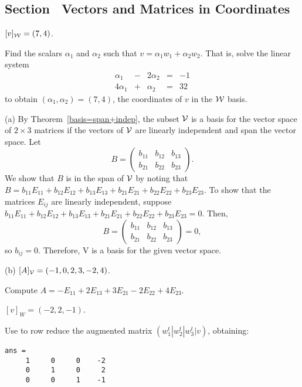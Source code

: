 \documentclass{ximera}
\begin{document}
\newpage
\subsection*{Section~\protect{\ref{S:coordinates}} Vectors and Matrices in
Coordinates}

\ans $[v]_{\cal W} = (7,4)$.

\soln Find the scalars $\alpha_1$ and $\alpha_2$ such that $v = \alpha_1w_1
+ \alpha_2w_2$.  That is, solve the linear system
\[ \begin{array}{rrrrr}
\alpha_1 & - & 2\alpha_2 & = & -1 \\
4\alpha_1 & + & \alpha_2 & = & 32 \end{array} \]
to obtain $(\alpha_1,\alpha_2) = (7,4)$, the coordinates
of $v$ in the ${\cal W}$ basis.

(a) By Theorem~\ref{basis=span+indep},
the subset ${\cal V}$ is a basis for the vector space of $2 \times
3$ matrices if the vectors of ${\cal V}$ are linearly independent and
span the vector space.  Let
\[ B = \left(\begin{array}{rrr} b_{11} & b_{12} & b_{13} \\ b_{21} &
b_{22} & b_{23} \end{array}\right). \]
We show that $B$ is in the span of ${\cal V}$ by noting that
$B = b_{11}E_{11} + b_{12}E_{12} + b_{13}E_{13} + b_{21}E_{21}
+ b_{22}E_{22} + b_{23}E_{23}$.  To show that the matrices $E_{ij}$
are linearly independent, suppose $b_{11}E_{11} + b_{12}E_{12} +
b_{13}E_{13} + b_{21}E_{21} + b_{22}E_{22} + b_{23}E_{23} = 0$.  Then,
\[  B = \left(\begin{array}{rrr} b_{11} & b_{12} & b_{13} \\ b_{21} &
b_{22} & b_{23} \end{array}\right) = 0, \]
so $b_{ij} = 0$.
Therefore, {\cal V} is a basis for the given vector space.

(b) \ans $[A]_{\cal V} = (-1,0,2,3,-2,4)$.

\soln Compute $A = -E_{11} + 2E_{13} + 3E_{21} - 2E_{22} + 4E_{23}$.

\ans $[v]_W = (-2,2,-1)$.

\soln Use \Matlab to row reduce the augmented matrix
$(w_1^t|w_2^t|w_3^t|v)$, obtaining:
\begin{verbatim}
ans = 
     1     0     0    -2
     0     1     0     2
     0     0     1    -1
\end{verbatim}
\end{document}
